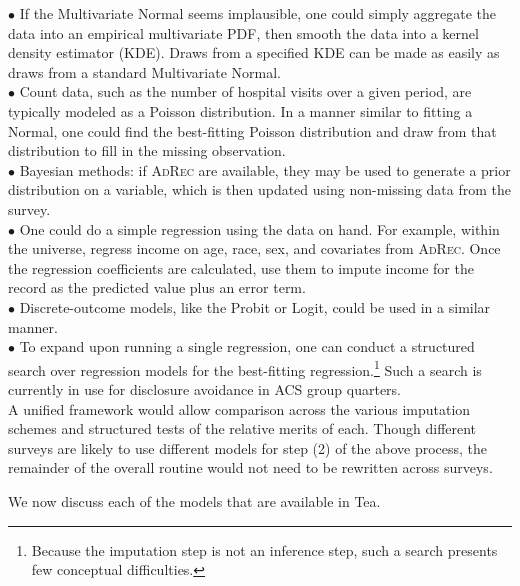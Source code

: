 \documentclass{article}
\def\adrec{\textsc{AdRec}\xspace}
\begin{document}
$\bullet$ If the Multivariate Normal seems implausible, one could simply aggregate the
data into an empirical multivariate PDF, then smooth the data into a kernel
density estimator (KDE). Draws from a specified KDE can be made as easily as
draws from a standard Multivariate Normal.\\

$\bullet$ Count data, such as the number of hospital visits over a given period, are
typically modeled as a Poisson distribution. In a manner similar to fitting a Normal, one
could find the best-fitting Poisson distribution and draw from that distribution to fill
in the missing observation.\\

$\bullet$ Bayesian methods: if \adrec are available, they may be used to generate a prior distribution
on a variable, which is then updated using non-missing data from the survey.\\

$\bullet$ One could do a simple regression using the data on hand. For example,
within the universe, regress income on  age, race, sex, and covariates from \adrec.
Once the regression coefficients are calculated, use them to impute income for
the record as the predicted value plus an error term. \\

$\bullet$ Discrete-outcome models, like the Probit or Logit, could be used in a similar
manner.\\

$\bullet$ To expand upon running a single regression, one can conduct a structured search
over regression models for the best-fitting regression.\footnote{Because the imputation
step is not an inference step, such a search presents few conceptual difficulties.}
Such a search is currently in use for disclosure avoidance in ACS group quarters.\\

A unified framework would allow comparison across the various imputation
schemes and structured tests of the relative merits of each. Though different surveys
are likely to use different models for step (2) of the above process, the
remainder of the overall routine would not need to be rewritten across surveys.

We now discuss each of the models that are available in Tea.
\end{document}
